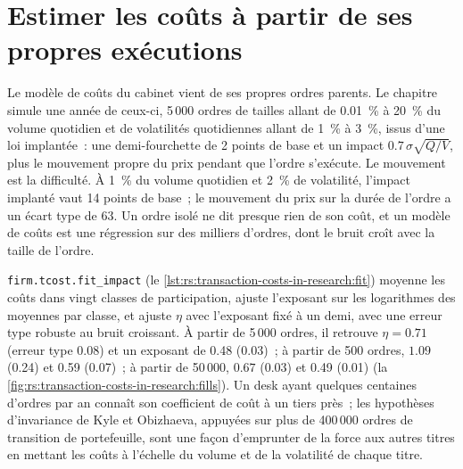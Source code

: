 \section{Estimer les coûts à partir de ses propres exécutions}

Le modèle de coûts du cabinet vient de ses propres ordres parents. Le chapitre simule une année de ceux-ci, 5\,000 ordres de tailles allant de 0.01~\% à 20~\% du volume quotidien et
de volatilités quotidiennes allant de 1~\% à 3~\%, issus d'une loi implantée~: une demi-fourchette de 2 points de base et un impact $0.7\,\sigma\sqrt{Q/V}$, plus le mouvement propre du prix pendant que l'ordre
s'exécute. Le mouvement est la difficulté. À 1~\% du volume quotidien et 2~\% de volatilité, l'impact implanté vaut 14 points de base~; le mouvement du prix sur la durée de l'ordre a un
écart type de 63. Un ordre isolé ne dit presque rien de son coût, et un modèle de coûts est une régression sur des milliers d'ordres, dont le bruit croît avec la
taille de l'ordre.

\texttt{firm.tcost.fit\_impact} (le \cref{lst:rs:transaction-costs-in-research:fit}) moyenne les coûts dans vingt classes de participation, ajuste l'exposant sur les
logarithmes des moyennes par classe, et ajuste $\eta$ avec l'exposant fixé à un demi, avec une erreur type robuste au bruit croissant. À partir de 5\,000 ordres, il retrouve
$\eta = 0.71$ (erreur type 0.08) et un exposant de 0.48 (0.03)~; à partir de 500 ordres, $1.09$ (0.24) et 0.59 (0.07)~; à partir de 50\,000, $0.67$ (0.03) et 0.49 (0.01)
(la \cref{fig:rs:transaction-costs-in-research:fills}). Un desk ayant quelques centaines d'ordres par an connaît son coefficient de coût à un tiers près~; les hypothèses d'invariance de Kyle et Obizhaeva,
appuyées sur plus de 400\,000 ordres de transition de portefeuille, sont une façon d'emprunter
de la force aux autres titres en mettant les coûts à l'échelle du volume et de la volatilité de chaque titre.

